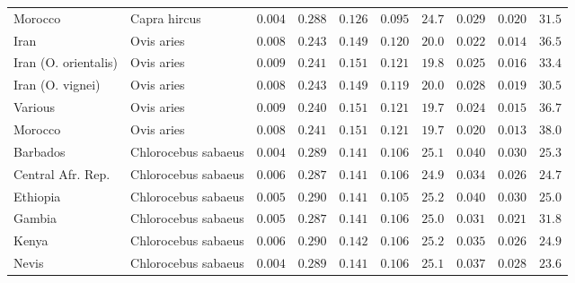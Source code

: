 \documentclass{article}
\begin{document}
\begin{center}
\begin{longtable*}{|l|l|r|r|r|r|r|r|r|r|}
            Morocco              & Capra hircus        & $ 0.004$              & $ 0.288$                      & $ 0.126$ & $ 0.095$     & $  24.7$      & $ 0.029$ & $ 0.020$ & $  31.5$ \\
            Iran                 & Ovis aries          & $ 0.008$              & $ 0.243$                      & $ 0.149$ & $ 0.120$     & $  20.0$      & $ 0.022$ & $ 0.014$   & $  36.5$    \\
            Iran (O. orientalis) & Ovis aries          & $ 0.009$              & $ 0.241$                      & $ 0.151$ & $ 0.121$     & $  19.8$      & $ 0.025$ & $ 0.016$ & $  33.4$ \\
            Iran (O. vignei)     & Ovis aries          & $ 0.008$              & $ 0.243$                      & $ 0.149$ & $ 0.119$     & $  20.0$      & $ 0.028$ & $ 0.019$ & $  30.5$ \\
            Various              & Ovis aries          & $ 0.009$              & $ 0.240$                      & $ 0.151$ & $ 0.121$     & $  19.7$      & $ 0.024$ & $ 0.015$   & $  36.7$    \\
            Morocco              & Ovis aries          & $ 0.008$              & $ 0.241$                      & $ 0.151$ & $ 0.121$     & $  19.7$      & $ 0.020$ & $ 0.013$   & $  38.0$    \\
            Barbados             & Chlorocebus sabaeus & $ 0.004$              & $ 0.289$                      & $ 0.141$ & $ 0.106$     & $  25.1$      & $ 0.040$ & $ 0.030$ & $  25.3$ \\
            Central Afr. Rep.    & Chlorocebus sabaeus & $ 0.006$              & $ 0.287$                      & $ 0.141$ & $ 0.106$     & $  24.9$ & $ 0.034$ & $ 0.026$ & $  24.7$ \\
            Ethiopia             & Chlorocebus sabaeus & $ 0.005$              & $ 0.290$                      & $ 0.141$ & $ 0.105$     & $  25.2$      & $ 0.040$ & $ 0.030$ & $  25.0$ \\
            Gambia               & Chlorocebus sabaeus & $ 0.005$              & $ 0.287$                      & $ 0.141$ & $ 0.106$     & $  25.0$      & $ 0.031$ & $ 0.021$ & $  31.8$ \\
            Kenya                & Chlorocebus sabaeus & $ 0.006$              & $ 0.290$                      & $ 0.142$ & $ 0.106$     & $  25.2$      & $ 0.035$ & $ 0.026$ & $  24.9$ \\
            Nevis                & Chlorocebus sabaeus & $ 0.004$              & $ 0.289$                      & $ 0.141$ & $ 0.106$     & $  25.1$      & $ 0.037$ & $ 0.028$ & $  23.6$ \\

\end{longtable*}
\end{center}
\end{document}
